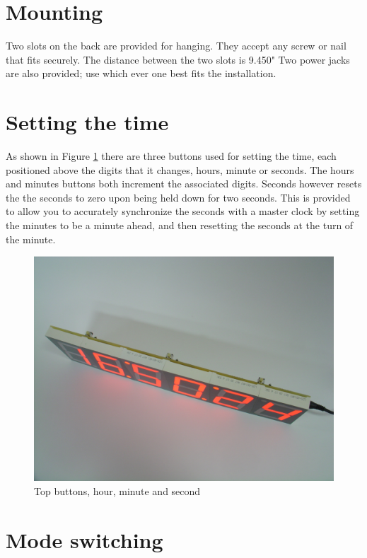 \documentclass{article}
\begin{document}
\section{Mounting}

Two slots on the back are provided for hanging. They accept any screw or nail
that fits securely. The distance between the two slots is 9.450" Two power
jacks are also provided; use which ever one best fits the installation.


\section{Setting the time}

As shown in Figure \ref{fig:top-buttons} there are three buttons used for
setting the time, each positioned above the digits that it changes, hours,
minute or seconds. The hours and minutes buttons both increment the associated
digits. Seconds however resets the the seconds to zero upon being held down for
two seconds. This is provided to allow you to accurately synchronize the
seconds with a master clock by setting the minutes to be a minute ahead, and
then resetting the seconds at the turn of the minute.

\begin{figure}
\centering
\includegraphics[width=4.75in]{figures/top-buttons.eps}
\caption{Top buttons, hour, minute and second}
\label{fig:top-buttons}
\end{figure}

\section{Mode switching}
\end{document}
